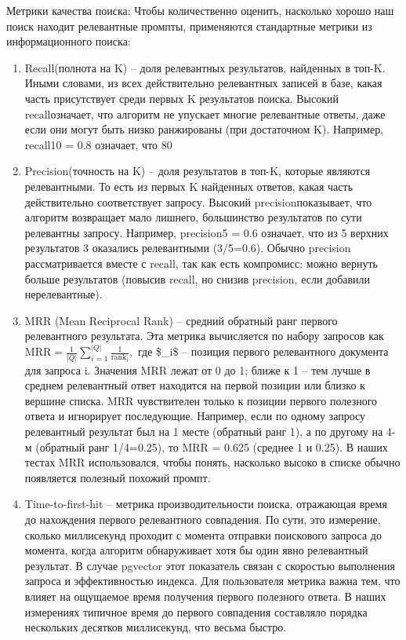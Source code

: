 Метрики качества поиска: Чтобы количественно оценить, насколько хорошо наш поиск находит релевантные промпты, применяются стандартные метрики из информационного поиска:
\begin{enumerate}[label=\arabic*.]
    \item  Recall\@K (полнота на K) – доля релевантных результатов, найденных в топ-K. Иными словами, из всех действительно релевантных записей в базе, какая часть присутствует среди первых K результатов поиска. Высокий recall\@K означает, что алгоритм не упускает многие релевантные ответы, даже если они могут быть низко ранжированы (при достаточном K). Например, recall\@10 = 0.8 означает, что 80%

\item Precision\@K (точность на K) – доля результатов в топ-K, которые являются релевантными. То есть из первых K найденных ответов, какая часть действительно соответствует запросу. Высокий precision\@K показывает, что алгоритм возвращает мало лишнего, большинство результатов по сути релевантны запросу. Например, precision\@5 = 0.6 означает, что из 5 верхних результатов 3 оказались релевантными (3/5=0.6). Обычно precision рассматривается вместе с recall, так как есть компромисс: можно вернуть больше результатов (повысив recall, но снизив precision, если добавили нерелевантные).

\item MRR (Mean Reciprocal Rank) – средний обратный ранг первого релевантного результата. Эта метрика вычисляется по набору запросов как
  $\text{MRR} = \frac{1}{|Q|}\sum_{i=1}^{|Q|} \frac{1}{\text{rank}_i},$
  где \$\_i\$ – позиция первого релевантного документа для запроса i. Значения MRR лежат от 0 до 1; ближе к 1 – тем лучше в среднем релевантный ответ находится на первой позиции или близко к вершине списка. MRR чувствителен только к позиции первого полезного ответа и игнорирует последующие. Например, если по одному запросу релевантный результат был на 1 месте (обратный ранг 1), а по другому на 4-м (обратный ранг 1/4=0.25), то MRR = 0.625 (среднее 1 и 0.25). В наших тестах MRR использовался, чтобы понять, насколько высоко в списке обычно появляется полезный похожий промпт.

\item Time-to-first-hit – метрика производительности поиска, отражающая время до нахождения первого релевантного совпадения. По сути, это измерение, сколько миллисекунд проходит с момента отправки поискового запроса до момента, когда алгоритм обнаруживает хотя бы один явно релевантный результат. В случае pgvector этот показатель связан с скоростью выполнения запроса и эффективностью индекса. Для пользователя метрика важна тем, что влияет на ощущаемое время получения первого полезного ответа. В наших измерениях типичное время до первого совпадения составляло порядка нескольких десятков миллисекунд, что весьма быстро.


\end{enumerate}

